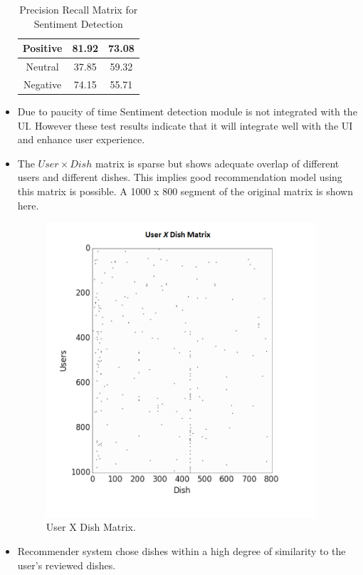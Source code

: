 \documentclass[twoside,12pt]{article}
\begin{document}
\begin{itemize}
\begin{table}[ht]
{\begin{tabular}  {| c | c | c |}
\hline
 Positive & 81.92 & 73.08 \\
\hline
 Neutral & 37.85 & 59.32 \\
\hline
 Negative & 74.15  & 55.71  \\
\hline
\end{tabular}}
\caption{Precision Recall Matrix for Sentiment Detection}
\label{precision_recall_matrix_sentiment_analysis}
\end{table}
\item
Due to paucity of time Sentiment detection module is not integrated with the UI. However these test results indicate that it will integrate well with the UI and enhance user experience.
\item  
The $User \times Dish$  matrix is sparse but shows adequate overlap of different users and different dishes. This implies good recommendation model using this matrix is possible. A 1000 x 800 segment of the original matrix is shown here.
\begin{figure}[hb]
	\centering
	\includegraphics[width=100mm]{sparse.png}
    \caption{User X Dish Matrix.}
\end{figure}
\item Recommender system chose dishes within a high degree of similarity to the user's reviewed dishes. 
\end{itemize}
\end{document}
